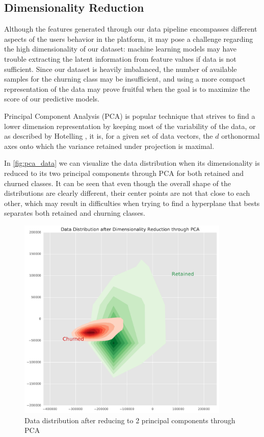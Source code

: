 \documentclass{kththesis}
\begin{document}
\subsection{Dimensionality Reduction}

Although the features generated through our data pipeline encompasses different aspects of the users behavior in the platform, it may pose a challenge regarding the high dimensionality of our dataset: machine learning models may have trouble extracting the latent information from feature values if data is not sufficient. Since our dataset is heavily imbalanced, the number of available samples for the churning class may be insufficient, and using a more compact representation of the data may prove fruitful when the goal is to maximize the score of our predictive models.

Principal Component Analysis (PCA) is popular technique that strives to find a lower dimension representation by keeping most of the variability of the data, or as described by Hotelling \citep{hotelling1933analysis}, it is, for a given set of data vectors, the $d$ orthonormal axes onto which the variance retained under projection is maximal.

In \autoref{fig:pca_data} we can visualize the data distribution when its dimensionality is reduced to its two principal components through PCA for both retained and churned classes. It can be seen that even though the overall shape of the distributions are clearly different, their center points are not that close to each other, which may result in difficulties when trying to find a hyperplane that bests separates both retained and churning classes.

	\begin{figure}[h]
    \centering
    \includegraphics[width=0.9\textwidth,keepaspectratio]{figures/pca_data.pdf}
    \caption{Data distribution after reducing to 2 principal components through PCA}
    \label{fig:pca_data}
	\end{figure}
\end{document}
